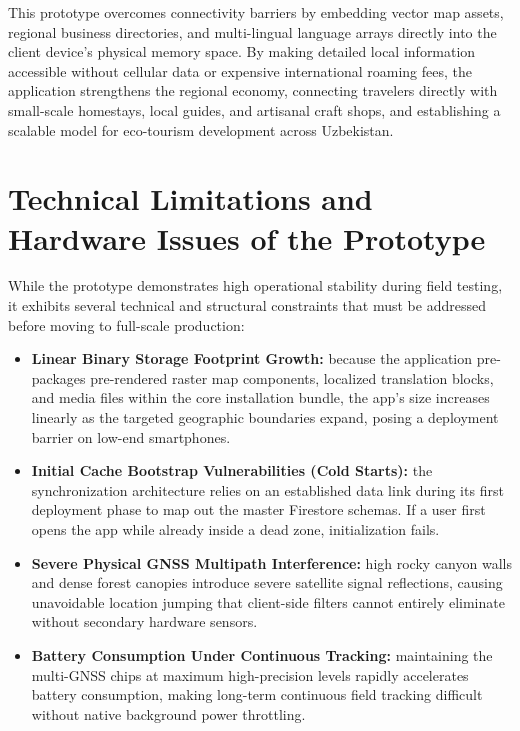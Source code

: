 \documentclass[12pt,a4paper,oneside]{report}
\begin{document}
This prototype overcomes connectivity barriers by embedding vector map assets, regional
business directories, and multi-lingual language arrays directly into the client device's
physical memory space. By making detailed local information accessible without cellular data
or expensive international roaming fees, the application strengthens the regional economy,
connecting travelers directly with small-scale homestays, local guides, and artisanal craft
shops, and establishing a scalable model for eco-tourism development across Uzbekistan.

\section{Technical Limitations and Hardware Issues of the Prototype}

While the prototype demonstrates high operational stability during field testing, it
exhibits several technical and structural constraints that must be addressed before moving
to full-scale production:

\begin{itemize}[leftmargin=1.4em]
  \item \textbf{Linear Binary Storage Footprint Growth:} because the application
        pre-packages pre-rendered raster map components, localized translation blocks, and
        media files within the core installation bundle, the app's size increases linearly
        as the targeted geographic boundaries expand, posing a deployment barrier on
        low-end smartphones.
  \item \textbf{Initial Cache Bootstrap Vulnerabilities (Cold Starts):} the synchronization
        architecture relies on an established data link during its first deployment phase to
        map out the master Firestore schemas. If a user first opens the app while already
        inside a dead zone, initialization fails.
  \item \textbf{Severe Physical GNSS Multipath Interference:} high rocky canyon walls and
        dense forest canopies introduce severe satellite signal reflections, causing
        unavoidable location jumping that client-side filters cannot entirely eliminate
        without secondary hardware sensors.
  \item \textbf{Battery Consumption Under Continuous Tracking:} maintaining the multi-GNSS
        chips at maximum high-precision levels rapidly accelerates battery consumption,
        making long-term continuous field tracking difficult without native background power
        throttling.
\end{itemize}
\end{document}

